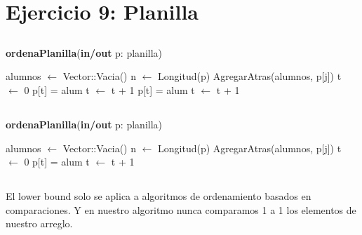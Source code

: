 \section{Ejercicio 9: Planilla}
\subsection{}

\begin{algorithm}[H]
\caption{
    \textbf{ordenaPlanilla}(\textbf{in/out} p: planilla)
}
    \begin{algorithmic}[1]
    \State alumnos $\gets$ Vector::Vacia()  
    \State n $\gets$ Longitud(p)    
         
                \State AgregarAtras(alumnos, p[j])
            \EndIf
        \EndFor
    \EndFor
    \State t $\gets$ 0
     
            \State p[t] = alum
            \State t $\gets$ t + 1
        \EndIf
    \EndFor
     
            \State p[t] = alum
            \State t $\gets$ t + 1
        \EndIf
    \EndFor
    \end{algorithmic}
\end{algorithm}

\subsection{}
\begin{algorithm}[H]
\caption{
    \textbf{ordenaPlanilla}(\textbf{in/out} p: planilla)
}
    \begin{algorithmic}[1]
    \State alumnos $\gets$ Vector::Vacia()  
    \State n $\gets$ Longitud(p)    
         
                \State AgregarAtras(alumnos, p[j])
            \EndIf
        \EndFor
    \EndFor
    \State t $\gets$ 0
         
                \State p[t] = alum
                \State t $\gets$ t + 1
            \EndIf
        \EndFor
    \EndFor
    \end{algorithmic}
\end{algorithm}

\subsection{}

El lower bound solo se aplica a algoritmos de ordenamiento basados en comparaciones. Y en nuestro algoritmo nunca comparamos 1 a 1 los elementos de nuestro arreglo.